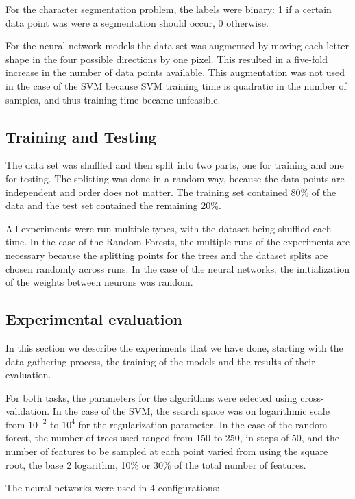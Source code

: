 For the character segmentation problem, the labels were binary: 1 if a certain data point was were a segmentation should occur, 0 otherwise. 

For the neural network models the data set was augmented by moving each letter shape in the four possible directions by one pixel. This resulted in a five-fold increase in the number of data points available. This augmentation was not used in the case of the SVM because SVM training time is quadratic in the number of samples, and thus training time became unfeasible. 

\subsection{Training and Testing}
The data set was shuffled and then split into two parts, one for training and one for testing. The splitting was done in a random way, because the data points are independent and order does not matter. The training set contained 80\% of the data and the test set contained the remaining 20\%. 

All experiments were run multiple types, with the dataset being shuffled each time. In the case of the Random Forests, the multiple runs of the experiments are necessary because the splitting points for the trees and the dataset splits are chosen randomly across runs. In the case of the neural networks, the initialization of the weights between neurons was random. 
\subsection{Experimental evaluation}
\label{sec:recog}
In this section we describe the experiments that we have done, starting with the data gathering process, the training of the models and the results of their evaluation.

For both tasks, the parameters for the algorithms were selected using cross-validation. In the case of the SVM, the search space was on logarithmic scale from $10^{-2}$ to $10^4$ for the regularization parameter. In the case of the random forest, the number of trees used ranged from 150 to 250, in steps of 50, and the number of features to be sampled at each point varied from using the square root, the base 2 logarithm, 10\% or 30\% of the total number of features.

The neural networks were used in 4 configurations: 

